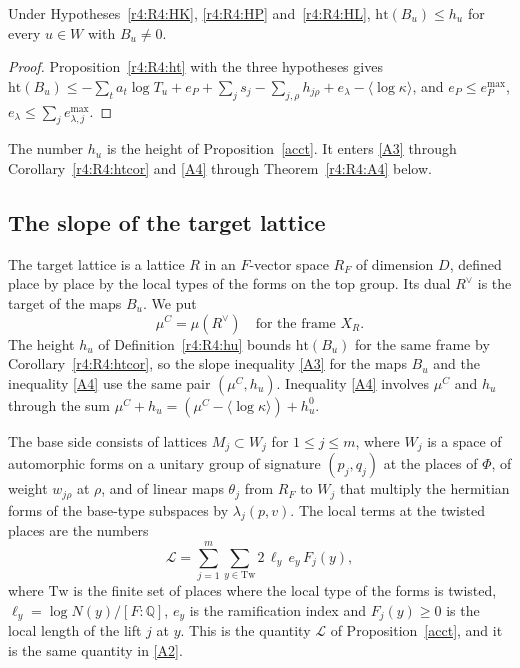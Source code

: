 \begin{corollary}\label{r4:R4:htcor}
Under Hypotheses~\ref{r4:R4:HK}, \ref{r4:R4:HP} and~\ref{r4:R4:HL}, $\mathrm{ht}(B_u)\le h_u$ for every $u\in W$ with $B_u\ne0$.
\end{corollary}

\begin{proof}
Proposition~\ref{r4:R4:ht} with the three hypotheses gives $\mathrm{ht}(B_u)\le-\sum_ta_t\log T_u+e_P+\sum_js_j-\sum_{j,\rho}h_{j\rho}+e_\lambda-\langle\log\kappa\rangle$, and $e_P\le e_P^{\max}$, $e_\lambda\le\sum_je^{\max}_{\lambda,j}$.
\end{proof}

The number $h_u$ is the height of Proposition~\ref{acct}. It enters \eqref{A3} through Corollary~\ref{r4:R4:htcor} and \eqref{A4} through Theorem~\ref{r4:R4:A4} below.

\subsection{The slope of the target lattice}\label{r4:sec:R4target}

The target lattice is a lattice $R$ in an $F$-vector space $R_F$ of dimension $D$, defined place by place by the local types of the forms on the top group. Its dual $R^\vee$ is the target of the maps $B_u$. We put
\[
\mu^C=\mu(R^\vee)\quad\text{for the frame }X_R .
\]
The height $h_u$ of Definition~\ref{r4:R4:hu} bounds $\mathrm{ht}(B_u)$ for the same frame by Corollary~\ref{r4:R4:htcor}, so the slope inequality \eqref{A3} for the maps $B_u$ and the inequality \eqref{A4} use the same pair $(\mu^C,h_u)$. Inequality \eqref{A4} involves $\mu^C$ and $h_u$ through the sum $\mu^C+h_u=(\mu^C-\langle\log\kappa\rangle)+h^0_u$.

The base side consists of lattices $M_j\subset W_j$ for $1\le j\le m$, where $W_j$ is a space of automorphic forms on a unitary group of signature $(p_j,q_j)$ at the places of $\Phi$, of weight $w_{j\rho}$ at $\rho$, and of linear maps $\theta_j$ from $R_F$ to $W_j$ that multiply the hermitian forms of the base-type subspaces by $\lambda_j(p,v)$. The local terms at the twisted places are the numbers
\begin{equation}\label{r4:R4:calL}
\mathcal L=\sum_{j=1}^m\sum_{y\in\mathrm{Tw}}2\,\ell_y\,e_y\,F_j(y),
\end{equation}
where $\mathrm{Tw}$ is the finite set of places where the local type of the forms is twisted, $\ell_y=\log N(y)/[F:\mathbb Q]$, $e_y$ is the ramification index and $F_j(y)\ge0$ is the local length of the lift $j$ at $y$. This is the quantity $\mathcal L$ of Proposition~\ref{acct}, and it is the same quantity in \eqref{A2}.

